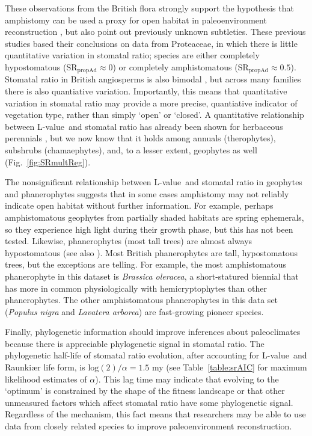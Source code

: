 \documentclass[12pt, oneside]{article}
\newcommand{\el}{L-value}
\begin{document}
These observations from the British flora strongly support the hypothesis that amphistomy can be used a proxy for open habitat in paleoenvironment reconstruction \citep{Carpenter_1994, Jordan_etal_2014, Carpenter_etal_2015}, but also point out previously unknown subtleties. These previous studies based their conclusions on data from Proteaceae, in which there is little quantitative variation in stomatal ratio; species are either completely hypostomatous ($\mathrm{SR_{propAd}} \approx 0$) or completely amphistomatous ($\mathrm{SR_{propAd}} \approx 0.5$). Stomatal ratio in British angiosperms is also bimodal \citep{Peat_Fitter_1994b}, but across many families there is also quantiative variation. Importantly, this means that quantitative variation in stomatal ratio may provide a more precise, quantiative indicator of vegetation type, rather than simply `open' or `closed'. A quantitative relationship between \el~and stomatal ratio has already been shown for herbaceous perennials \citep{Bucher_etal_2017}, but we now know that it holds among annuals (therophytes), subshrubs (chamaephytes), and, to a lesser extent, geophytes as well (Fig.~\ref{fig:SRmultReg}). 

The nonsignificant relationship between \el~and stomatal ratio in geophytes and phanerophytes suggests that in some cases amphistomy may not reliably indicate open habitat without further information. For example, perhaps amphistomatous geophytes from partially shaded habitats are spring ephemerals, so they  experience high light during their growth phase, but this has not been tested. Likewise, phanerophytes (most tall trees) are almost always hypostomatous (see also \cite{Muir_2015}). Most British phanerophytes are tall, hypostomatous trees, but the exceptions are telling. For example, the most amphistomatous phanerophyte in this dataset is \textit{Brassica oleracea}, a short-statured biennial that has more in common physiologically with hemicryptophytes than other phanerophytes. The other amphistomatous phanerophytes in this data set (\textit{Populus nigra} and \textit{Lavatera arborea}) are fast-growing pioneer species.

Finally, phylogenetic information should improve inferences about paleoclimates because there is appreciable phylogenetic signal in stomatal ratio. The phylogenetic half-life of stomatal ratio evolution, after accounting for \el~and Raunki\ae r life form, is $\mathrm{log}(2) / \alpha = 1.5$ my (see Table~\ref{table:srAIC} for maximum likelihood estimates of $\alpha$). This lag time may indicate that evolving to the `optimum' is constrained by the shape of the fitness landscape \citep{Muir_2015} or that other unmeasured factors which affect stomatal ratio have some phylogenetic signal. Regardless of the mechanism, this fact means that researchers may be able to use data from closely related species to improve paleoenvironment reconstruction.
\end{document}
